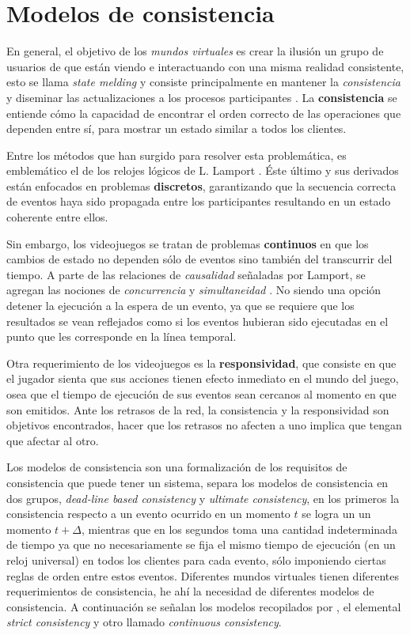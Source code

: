 \section{Modelos de consistencia}

En general, el objetivo de los \emph{mundos virtuales} es crear la ilusión un grupo de usuarios de que están viendo e interactuando con una misma realidad consistente, esto se llama \emph{state melding} y consiste principalmente en mantener la \emph{consistencia} y diseminar las actualizaciones a los procesos participantes \cite{liu2012survey}. La \textbf{consistencia} se entiende cómo la capacidad de encontrar el orden correcto de las operaciones que dependen entre sí, para mostrar un estado similar a todos los clientes.

Entre los métodos que han surgido para resolver esta problemática, es emblemático el de los relojes lógicos de L. Lamport \cite{lamport1978time}. Éste último y sus derivados están enfocados en problemas \textbf{discretos}, garantizando que la secuencia correcta de eventos haya sido propagada entre los participantes resultando en un estado coherente entre ellos.

Sin embargo, los videojuegos se tratan de problemas \textbf{continuos} en que los cambios de estado no dependen sólo de eventos sino también del transcurrir del tiempo. A parte de las relaciones de \emph{causalidad} señaladas por Lamport, se agregan las nociones de \emph{concurrencia} y \emph{simultaneidad} \cite{liu2012survey}. No siendo una opción detener la ejecución a la espera de un evento, ya que se requiere que los resultados se vean reflejados como si los eventos hubieran sido ejecutadas en el punto que les corresponde en la línea temporal\cite{mauve2004local}.

Otra requerimiento de los videojuegos es la \textbf{responsividad}, que consiste en que el jugador sienta que sus acciones tienen efecto inmediato en el mundo del juego, osea que el tiempo de ejecución de sus eventos sean cercanos al momento en que son emitidos. Ante los retrasos de la red, la consistencia y la responsividad son objetivos encontrados, hacer que los retrasos no afecten a uno implica que tengan que afectar al otro.

Los modelos de consistencia son una formalización de los requisitos de consistencia que puede tener un sistema, \cite{liu2012survey} separa los modelos de consistencia en dos grupos, \emph{dead-line based consistency} y \emph{ultimate consistency}, en los primeros la consistencia respecto a un evento ocurrido en un momento $t$ se logra un un momento $t+\Delta$, mientras que en los segundos toma una cantidad indeterminada de tiempo ya que no necesariamente se fija el mismo tiempo de ejecución (en un reloj universal) en todos los clientes para cada evento, sólo imponiendo ciertas reglas de orden entre estos eventos. Diferentes mundos virtuales tienen diferentes requerimientos de consistencia, he ahí la necesidad de diferentes modelos de consistencia. A continuación se señalan los modelos recopilados por \cite{liu2012survey}, el elemental \emph{strict consistency} y otro llamado \emph{continuous consistency}.

